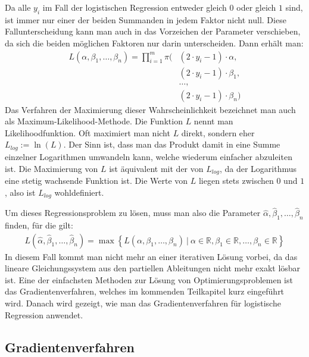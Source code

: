 Da alle $y_i$ im Fall der logistischen Regression entweder gleich $0$ oder gleich $1$ sind, ist immer nur einer der beiden Summanden in jedem Faktor nicht null. Diese Fallunterscheidung kann man auch in das Vorzeichen der Parameter verschieben, da sich die beiden möglichen Faktoren nur darin unterscheiden. Dann erhält man:
\begin{align*}
    L(\alpha, \beta_1, \dots, \beta_n) = \prod_{i=1}^m \pi(&(2 \cdot y_i - 1) \cdot \alpha, \\
    &(2 \cdot y_i - 1) \cdot \beta_1, \\
    &\dots, \\
    &(2 \cdot y_i - 1) \cdot \beta_n)
\end{align*}
Das Verfahren der Maximierung dieser Wahrscheinlichkeit bezeichnet man auch als Maximum-Likelihood-Methode. Die Funktion $L$ nennt man Likelihoodfunktion. Oft maximiert man nicht $L$ direkt, sondern eher $L_{log} := \ln(L)$. Der Sinn ist, dass man das Produkt damit in eine Summe einzelner Logarithmen umwandeln kann, welche wiederum einfacher abzuleiten ist. Die Maximierung von $L$ ist äquivalent mit der von $L_{log}$, da der Logarithmus eine stetig wachsende Funktion ist. Die Werte von $L$ liegen stets zwischen $0$ und $1$, also ist $L_{log}$ wohldefiniert.

Um dieses Regressionsproblem zu lösen, muss man also die Parameter $\hat\alpha, \hat\beta_1, \dots, \hat\beta_n$ finden, für die gilt:
\begin{align*}
    L(\hat\alpha, \hat\beta_1, \dots, \hat\beta_n) = \max \left\{ L(\alpha, \beta_1, \dots, \beta_n) ~|~ \alpha \in \mathbb{R}, \beta_1 \in \mathbb{R}, \dots, \beta_n \in \mathbb{R} \right\}
\end{align*}
In diesem Fall kommt man nicht mehr an einer iterativen Lösung vorbei, da das lineare Gleichungssystem aus den partiellen Ableitungen nicht mehr exakt lösbar ist. Eine der einfachsten Methoden zur Lösung von Optimierungsproblemen ist das Gradientenverfahren, welches im kommenden Teilkapitel kurz eingeführt wird. Danach wird gezeigt, wie man das Gradientenverfahren für logistische Regression anwendet.

\subsection{Gradientenverfahren}
\label{subsection:2:2:1}

